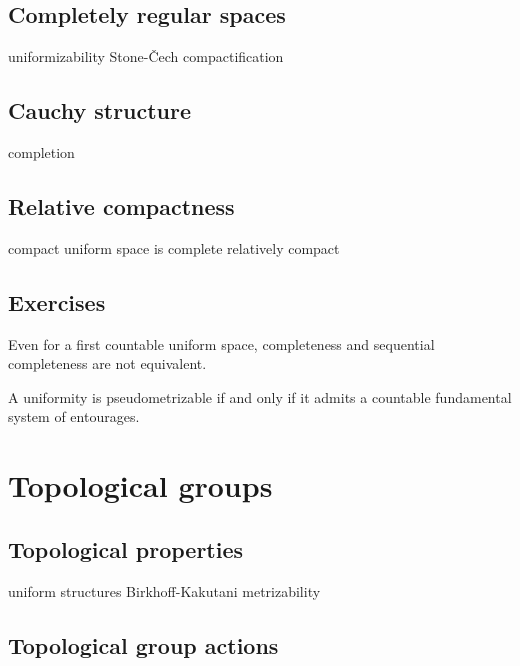 \documentclass{../../large}
\begin{document}
\section{Completely regular spaces}
uniformizability
Stone-\v Cech compactification

\section{Cauchy structure}
completion

\section{Relative compactness}
compact uniform space is complete
relatively compact

\section*{Exercises}
\begin{prb}
Even for a first countable uniform space, completeness and sequential completeness are not equivalent.
\end{prb}
\begin{prb}
A uniformity is pseudometrizable if and only if it admits a countable fundamental system of entourages.
\end{prb}










\chapter{Topological groups}

\section{Topological properties}
uniform structures
Birkhoff-Kakutani
metrizability

\section{Topological group actions}
\end{document}
